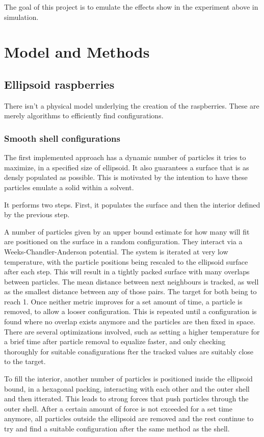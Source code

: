\documentclass[12pt, DIV=12]{scrartcl}
\begin{document}
The goal of this project is to emulate the effects show in the experiment above in simulation.

\section{Model and Methods}
\subsection{Ellipsoid raspberries}
There isn't a physical model underlying the creation of the raspberries. These are merely algorithms to efficiently find configurations.
\subsubsection{Smooth shell configurations}
The first implemented approach has a dynamic number of particles it tries to maximize, in a specified size of ellipsoid. It also guarantees a surface that is as densly populated as possible. This is motivated by the intention to have these particles emulate a solid within a solvent.

It performs two steps. First, it populates the surface and then the interior defined by the previous step.

A number of particles given by an upper bound estimate for how many will fit are positioned on the surface in a random configuration. They interact via a Weeks-Chandler-Anderson potential. The system is iterated at very low temperature, with the particle positions being rescaled to the ellipsoid surface after each step.
This will result in a tightly packed surface with many overlaps between particles. The mean distance between next neighbours is tracked, as well as the smallest distance between any of those pairs. The target for both being to reach 1. Once neither metric improves for a set amount of time, a particle is removed, to allow a looser configuration. This is repeated until a configuration is found where no overlap exists anymore and the particles are then fixed in space.
There are several optimizations involved, such as setting a higher temperature for a brief time after particle removal to equalize faster, and only checking thoroughly for suitable conafigurations fter the tracked values are suitably close to the target.

To fill the interior, another number of particles is positioned inside the ellipsoid bound, in a hexagonal packing, interacting with each other and the outer shell and then itterated. This leads to strong forces that push particles through the outer shell. After a certain amount of force is not exceeded for a set time anymore, all particles outside the ellipsoid are removed and the rest continue to try and find a suitable configuration after the same method as the shell.
\end{document}
